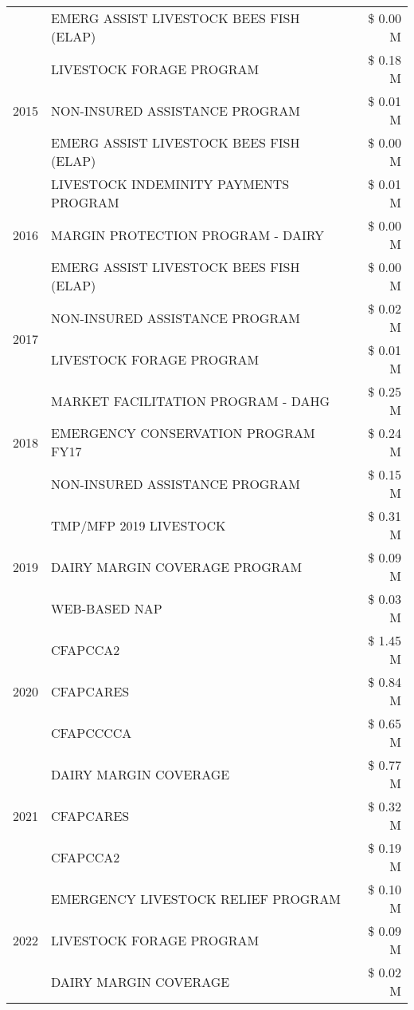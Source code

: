 \begin{tabular}{llr}
 & EMERG ASSIST LIVESTOCK BEES FISH (ELAP) & \$ 0.00 M \\
\cline{1-3}
\multirow[t]{3}{*}{2015} & LIVESTOCK FORAGE PROGRAM & \$ 0.18 M \\
 & NON-INSURED ASSISTANCE PROGRAM & \$ 0.01 M \\
 & EMERG ASSIST LIVESTOCK BEES FISH (ELAP) & \$ 0.00 M \\
\cline{1-3}
\multirow[t]{3}{*}{2016} & LIVESTOCK INDEMINITY PAYMENTS PROGRAM & \$ 0.01 M \\
 & MARGIN PROTECTION PROGRAM - DAIRY & \$ 0.00 M \\
 & EMERG ASSIST LIVESTOCK BEES FISH (ELAP) & \$ 0.00 M \\
\cline{1-3}
\multirow[t]{2}{*}{2017} & NON-INSURED ASSISTANCE PROGRAM & \$ 0.02 M \\
 & LIVESTOCK FORAGE PROGRAM & \$ 0.01 M \\
\cline{1-3}
\multirow[t]{3}{*}{2018} & MARKET FACILITATION PROGRAM - DAHG & \$ 0.25 M \\
 & EMERGENCY CONSERVATION PROGRAM FY17 & \$ 0.24 M \\
 & NON-INSURED ASSISTANCE PROGRAM & \$ 0.15 M \\
\cline{1-3}
\multirow[t]{3}{*}{2019} & TMP/MFP 2019 LIVESTOCK & \$ 0.31 M \\
 & DAIRY MARGIN COVERAGE PROGRAM & \$ 0.09 M \\
 & WEB-BASED NAP & \$ 0.03 M \\
\cline{1-3}
\multirow[t]{3}{*}{2020} & CFAPCCA2 & \$ 1.45 M \\
 & CFAPCARES & \$ 0.84 M \\
 & CFAPCCCCA & \$ 0.65 M \\
\cline{1-3}
\multirow[t]{3}{*}{2021} & DAIRY MARGIN COVERAGE & \$ 0.77 M \\
 & CFAPCARES & \$ 0.32 M \\
 & CFAPCCA2 & \$ 0.19 M \\
\cline{1-3}
\multirow[t]{3}{*}{2022} & EMERGENCY LIVESTOCK RELIEF PROGRAM & \$ 0.10 M \\
 & LIVESTOCK FORAGE PROGRAM & \$ 0.09 M \\
 & DAIRY MARGIN COVERAGE & \$ 0.02 M \\
\cline{1-3}
\bottomrule
\end{tabular}
